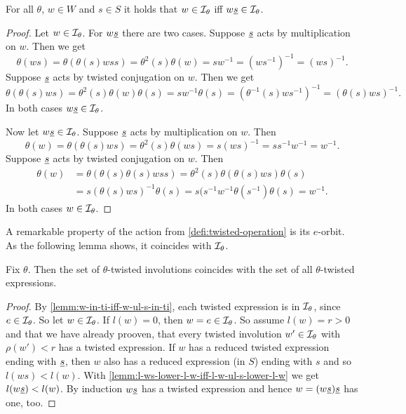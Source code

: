 \begin{lemm}
	For all $\theta$, $w \in W$ and $s \in S$ it holds that $w \in \mathcal{I}_{\theta}$ iff $w \underline{s} \in \mathcal{I}_{\theta}$.

	\begin{proof}
		Let $w \in \mathcal{I}_{\theta}$. For $w \underline{s}$ there are two cases. Suppose $\underline{s}$ acts by multiplication on $w$. Then we get
		$$ \theta(ws) = \theta(\theta(s)wss) = \theta^2(s) \theta(w) = sw^{-1} = (ws^{-1})^{-1} = (ws)^{-1}. $$
		Suppose $\underline{s}$ acts by twisted conjugation on $w$. Then we get
		$$ \theta(\theta(s)ws) = \theta^2(s) \theta(w) \theta(s) = sw^{-1}\theta(s) = (\theta^{-1}(s)ws^{-1})^{-1} = (\theta(s)ws)^{-1}. $$
		In both cases $w \underline{s} \in \mathcal{I}_{\theta}$.

		Now let $w \underline{s} \in \mathcal{I}_{\theta}$. Suppose $\underline{s}$ acts by multiplication on $w$. Then
		$$ \theta(w) = \theta(\theta(s)ws) = \theta^2(s)\theta(ws) = s (ws)^{-1} = ss^{-1}w^{-1} = w^{-1}. $$
		Suppose $\underline{s}$ acts by twisted conjugation on $w$. Then
		\begin{align*}
			\theta(w)	& = \theta(\theta(s)\theta(s)wss) = \theta^2(s) \theta(\theta(s)ws) \theta(s) \\
						& = s (\theta(s)ws)^{-1} \theta(s) = s(s^{-1} w^{-1} \theta(s^{-1}) \theta(s) = w^{-1}.
		\end{align*}
		In both cases $w \in \mathcal{I}_{\theta}$.
	\end{proof}
\end{lemm}

A remarkable property of the action from \ref{defi:twisted-operation} is its $e$-orbit. As the following lemma shows, it coincides with $\mathcal{I}_{\theta}$.

\begin{lemm}
	Fix $\theta$. Then the set of $\theta$-twisted involutions coincides with the set of all $\theta$-twisted expressions.

	\begin{proof}
		By \ref{lemm:w-in-ti-iff-w-ul-s-in-ti}, each twisted expression is in $\mathcal{I}_{\theta}$, since $e \in \mathcal{I}_{\theta}$. So let $w \in \mathcal{I}_{\theta}$. If $l(w) = 0$, then $w = e \in \mathcal{I}_{\theta}$. So assume $l(w) = r > 0$ and that we have already prooven, that every twisted involution $w' \in \mathcal{I}_{\theta}$ with $\rho(w') < r$ has a twisted expression. If $w$ has a reduced twisted expression ending with $\underline{s}$, then $w$ also has a reduced expression (in $S$) ending with $s$ and so $l(ws) < l(w)$. With \ref{lemm:l-ws-lower-l-w-iff-l-w-ul-s-lower-l-w} we get $l(w \underline{s}) < l(w)$. By induction $w \underline{s}$ has a twisted expression and hence $w = (w \underline{s}) \underline{s}$ has one, too.
	\end{proof} 
\end{lemm}

